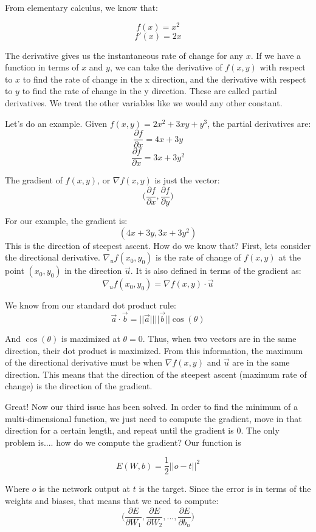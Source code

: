 \documentclass{article}
\begin{document}
From elementary calculus, we know that:

\[f(x) = x^2\]
\[f'(x) = 2x\]

The derivative gives us the instantaneous rate of change for any $x$. If we have a function in terms of $x$ and $y$, we can take the derivative of $f(x, y)$ with respect to $x$ to find the rate of change in the x direction, and the derivative with respect to $y$ to find the rate of change in the y direction. These are called partial derivatives. We treat the other variables like we would any other constant.

Let's do an example. Given $f(x, y) = 2x^2 + 3xy + y^3$, the partial derivatives are:
\[\frac{\partial f}{\partial x} = 4x + 3y\]
\[\frac{\partial f}{\partial x} = 3x + 3y^2\]

The gradient of $f(x, y)$, or $\nabla f(x, y)$ is just the vector:
\[\big(\frac{\partial f}{\partial x}, \frac{\partial f}{\partial y}\big)\]

For our example, the gradient is:
\[(4x + 3y,3x + 3y^2)\]
This is the direction of steepest ascent. How do we know that?
First, lets consider the directional derivative. $\nabla_u f(x_0, y_0)$ is the rate of change of $f(x, y)$ at the point $(x_0, y_0)$ in the direction $\vec u$. It is also defined in terms of the gradient as:
\[\nabla_u f(x_0, y_0) = \nabla f(x, y) \cdot \vec u\]

We know from our standard dot product rule:
\[\vec a \cdot \vec b = ||\vec a ||||\vec b||\cos(\theta)\]

And $\cos(\theta)$ is maximized at $\theta = 0$. Thus, when two vectors are in the same direction, their dot product is maximized. From this information, the maximum of the directional derivative must be when $\nabla f(x, y)$ and $\vec u$ are in the same direction. This means that the direction of the steepest ascent (maximum rate of change) is the direction of the gradient.

Great! Now our third issue has been solved. In order to find the minimum of a multi-dimensional function, we just need to compute the gradient, move in that direction for a certain length, and repeat until the gradient is 0. The only problem is.... how do we compute the gradient? Our function is

\[E(W, b) = \frac{1}{2}||o-t||^2\]

Where $o$ is the network output at $t$ is the target. Since the error is in terms of the weights and biases, that means that we need to compute:
\[\big(\frac{\partial E}{\partial W_1}, \frac{\partial E}{\partial W_2}, ..., \frac{\partial E}{\partial b_n}\big)\]
\end{document}
